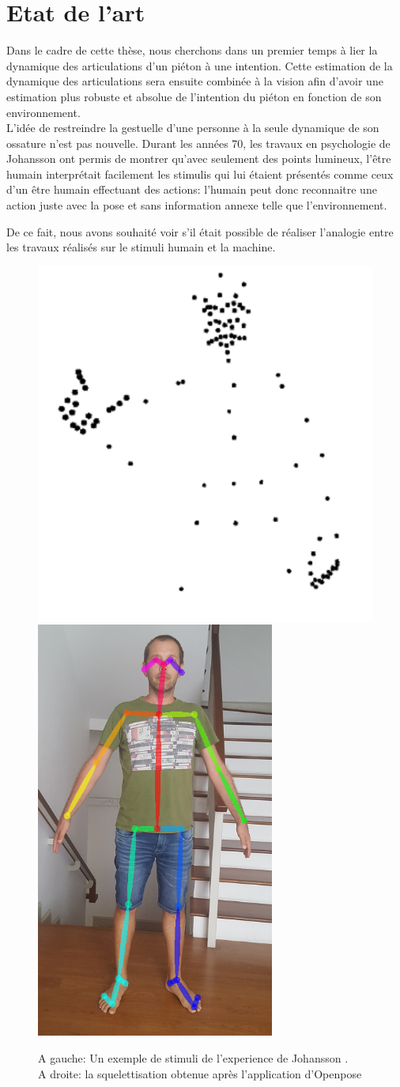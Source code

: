 \chapter{Etat de l'art}
\label{sec:SOTA}

Dans le cadre de cette thèse, nous cherchons dans un premier temps à lier la dynamique des articulations d'un piéton à une intention. Cette estimation de la dynamique des articulations sera ensuite combinée à la vision afin d’avoir une estimation plus robuste et absolue de l'intention du piéton en fonction de son environnement.\\

L'idée de restreindre la gestuelle d'une personne à la seule dynamique de son ossature n'est pas nouvelle.
Durant les années 70, les travaux en psychologie de Johansson  \cite{johansson1973visual,johansson1976spatio} ont permis de montrer qu'avec seulement des points lumineux, l'être humain interprétait facilement les stimulis qui lui étaient présentés comme ceux d'un être humain effectuant des actions: l'humain peut donc reconnaitre une action juste avec la pose et sans information annexe telle que l'environnement. 

De ce fait, nous avons souhaité voir s'il était possible de réaliser l'analogie entre les travaux réalisés sur le stimuli humain et la machine.

\begin{figure}[H]
    \centering
    \includegraphics[width=0.34\linewidth]{Images/Johansson.png}
    \includegraphics[width=0.2\linewidth]{Images/openpose2.png}
    \caption{A gauche: Un exemple de stimuli de l'experience de Johansson \cite{johansson1973visual,johansson1976spatio}.\\ A droite: la squelettisation obtenue après l'application d'Openpose \cite{cao2017realtime}}
    \label{fig:Johansson}
\end{figure}

